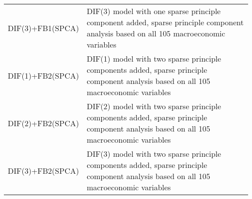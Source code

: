 \begin{footnotesize}
\begin{tabularx}{\linewidth}{lX}
DIF(3)+FB1(SPCA)          & DIF(3) model with one sparse principle component added, sparse principle component analysis based on all 105 macroeconomic variables \\
DIF(1)+FB2(SPCA)          & DIF(1) model with two sparse principle components added, sparse principle component analysis based on all 105 macroeconomic variables \\
DIF(2)+FB2(SPCA)          & DIF(2) model with two sparse principle components added, sparse principle component analysis based on all 105 macroeconomic variables \\
DIF(3)+FB2(SPCA)          & DIF(3) model with two sparse principle components added, sparse principle component analysis based on all 105 macroeconomic variables
\end{tabularx}
\end{footnotesize}
